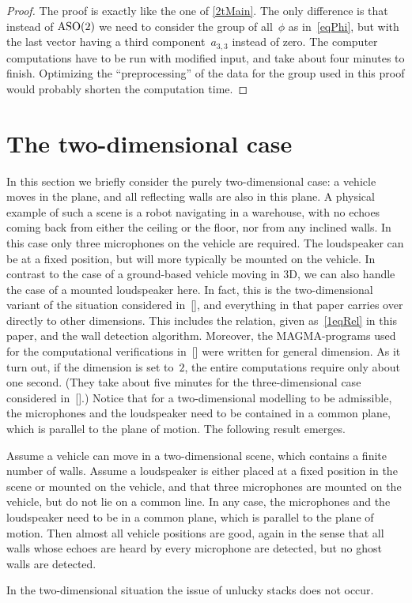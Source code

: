 \documentclass[reqno]{amsart}
\begin{document}
\begin{proof}
  The proof is exactly like the one of \cref{2tMain}. The only
  difference is that instead of $\operatorname{ASO}(2)$ we need to consider the
  group of all~$\phi$ as in~\eqref{eqPhi}, but with the last vector
  having a third component~$a_{3,3}$ instead of zero. The computer
  computations have to be run with modified input, and take about four
  minutes to finish. Optimizing the ``preprocessing'' of the data for
  the group used in this proof would probably shorten the computation
  time.
\end{proof}

\section{The two-dimensional case} \label{sDim2}

In this section we briefly consider the purely two-dimensional case: a vehicle moves in the plane, and all reflecting walls are also in this plane. A physical example of such a scene is a robot navigating in a warehouse, with no echoes coming back from either the ceiling or the floor, nor from any inclined walls. In this case only three microphones on the vehicle are required. The loudspeaker can be at a fixed position, but will more typically be mounted on the vehicle. In contrast to the case of a ground-based vehicle moving in 3D, we can also handle the case of a mounted loudspeaker here. In fact, this is the two-dimensional variant of the situation considered in~[], and everything in that paper carries over directly to other dimensions. This includes the relation, given as~\eqref{1eqRel} in this paper, and the wall detection algorithm. Moreover, the MAGMA-programs used for the computational verifications in~[] were written for general dimension. As it turn out, if the dimension is set to~$2$, the entire computations require only about one second. (They take about five minutes for the three-dimensional case considered in~[].) Notice that for a two-dimensional modelling to be admissible, the microphones and the loudspeaker need to be contained in a common plane, which is parallel to the plane of motion.
The following result emerges.

\begin{theorem} \label{3t2D}%
  Assume a vehicle can move in a two-dimensional scene, which contains a finite number of walls. Assume a loudspeaker is either placed at a fixed position in the scene or mounted on the vehicle, and that three microphones are mounted on the vehicle, but do not lie on a common line. In any case, the microphones and the loudspeaker need to be in a common plane, which is parallel to the plane of motion. Then almost all vehicle positions are good, again in the sense that all walls whose echoes are heard by every microphone are detected, but no ghost walls are detected.
\end{theorem}

In the two-dimensional situation the issue of unlucky stacks does not occur.

 
\end{document}
